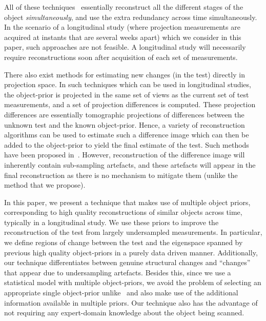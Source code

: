 \documentclass[journal]{IEEEtran}
\begin{document}
All of these
techniques~\cite{daniil2015,koen2020,Van2015,HaoGao,Van2014}
essentially reconstruct all the different stages of the object
\textit{simultaneously}, and use the extra redundancy across time
simultaneously. In the scenario of a longitudinal study (where
projection measurements are acquired at instants that are several
weeks apart) which we consider in this paper, such approaches are not
feasible. A longitudinal study will necessarily require
reconstructions soon after acquisition of each set of measurements.

There also exist methods for estimating new changes (in the test)
directly in projection space. In such techniques which can be used in
longitudinal studies, the object-prior is projected in the same set of
views as the current set of test measurements, and a set of projection
differences is computed. These projection differences are essentially
tomographic projections of differences between the unknown test and
the known object-prior. Hence, a variety of reconstruction algorithms
can be used to estimate such a difference image which can then be
added to the object-prior to yield the final estimate of the
test. Such methods have been proposed
in~\cite{Pourmorteza2015,Lee2012}. However, reconstruction of the
difference image will inherently contain sub-sampling artefacts, and
these artefacts will appear in the final reconstruction as there is no
mechanism to mitigate them (unlike the method that we propose). %


In this paper, we present a technique that makes use of multiple
object priors, corresponding to high quality reconstructions of
similar objects across time, typically in a longitudinal study.  We
use these priors to improve the reconstruction of the test from
largely undersampled measurements. In particular, we define regions of
change between the test and the eigenspace spanned by previous high
quality object-priors in a purely data driven manner. Additionally,
our technique differentiates between genuine structural changes and
``changes'' that appear due to undersampling artefacts.  Besides this,
since we use a statistical model with multiple object-priors, we avoid
the problem of selecting an appropriate single object-prior
unlike~\cite{PICCS,Pourmorteza2015,Lee2012,pirple,Marjolein2016} and
also make use of the additional information available in multiple
priors. Our technique also has the advantage of not requiring any
expert-domain knowledge about the object being scanned.
\end{document}

